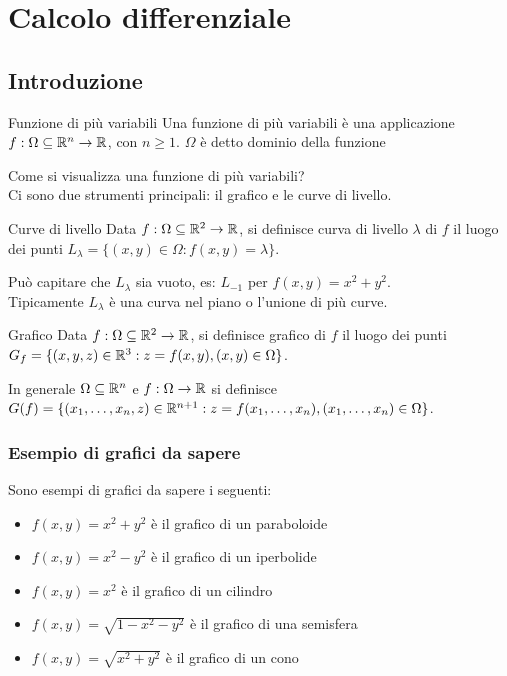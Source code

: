 \chapter{Calcolo differenziale}

\section{Introduzione}
\begin{definizione}{Funzione di più variabili}
Una funzione di più variabili è una applicazione $f:\Omega \subseteq \mathbb{R}^n \rightarrow \mathbb{R}$, con $n\geq 1.$ $\Omega$ è detto dominio della funzione\\
\end{definizione}

Come si visualizza una funzione di più variabili?\\
Ci sono due strumenti principali: il grafico e le curve di livello.\\

\begin{definizione}{Curve di livello}
Data $f:\Omega \subseteq \mathbb{R}^2 \rightarrow \mathbb{R}$, si definisce curva di livello $\lambda$ di $f$ il luogo dei punti $L_\lambda=\{(x,y)\in \Omega : f(x,y)=\lambda\}$.\\
\end{definizione}
Può capitare che $L_\lambda$ sia vuoto, es: $L_{-1}$ per $f(x,y)= x^2+y^2$.\\
Tipicamente $L_\lambda$ è una curva nel piano o l'unione di più curve.\\


\begin{definizione}{Grafico}
Data $f:\Omega \subseteq \mathbb{R}^2 \rightarrow \mathbb{R}$, si definisce grafico di $f$ il luogo dei punti $G_f=\{(x,y,z)\in \mathbb{R}^3 : z=f(x,y), (x,y)\in \Omega\}$.\\
\end{definizione}
In generale $\Omega \subseteq \mathbb{R}^n$ e $f:\Omega \rightarrow \mathbb{R}$ si definisce $G(f)=\{(x_1, \dots, x_n, z)\in \mathbb{R}^{n+1} : z=f(x_1, \dots, x_n), (x_1, \dots, x_n)\in \Omega\}$.\\

\subsection{Esempio di grafici da sapere}
Sono esempi di grafici da sapere i seguenti:
\begin{itemize}
  \item $f(x,y)=x^2+y^2$ è il grafico di un paraboloide
  \item $f(x,y)=x^2-y^2$ è il grafico di un iperbolide
  \item $f(x,y)=x^2$ è il grafico di un cilindro
  \item $f(x,y)=\sqrt{1-x^2-y^2}$ è il grafico di una semisfera
  \item $f(x,y)=\sqrt{x^2+y^2}$ è il grafico di un cono
\end{itemize}

